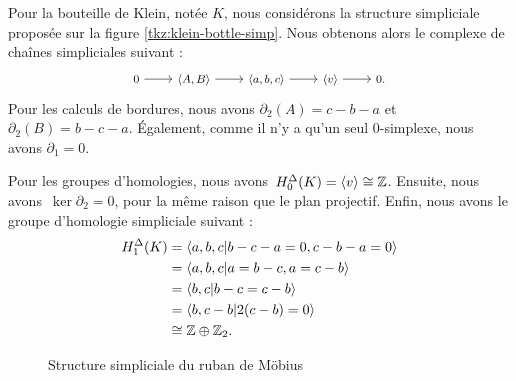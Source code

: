\phantom{}

\begin{exemple}
Pour la bouteille de Klein, notée $K$, nous considérons la structure simpliciale proposée sur la figure \ref{tkz:klein-bottle-simp}. Nous obtenons alors le complexe de chaînes simpliciales suivant : 
\[\footnotesize
\begin{tikzcd}
0\arrow[r]&\langle A,B\rangle\arrow[r]&\langle a,b,c\rangle\arrow[r]&\langle v\rangle\arrow[r]&0.
\end{tikzcd}
\]Pour les calculs de bordures, nous avons $\partial_2(A)=c-b-a$ et~${\partial_2(B)=b-c-a}$. Également, comme il n'y a qu'un seul 0-simplexe, nous avons $\partial_1=0$.

Pour les groupes d'homologies, nous avons~${H^\Delta_0(K)=\langle v\rangle\cong\mathbb{Z}}$. Ensuite, nous avons~${\ker\partial_2=0}$, pour la même raison que le plan projectif. Enfin, nous avons le groupe d'homologie simpliciale suivant : \[\begin{split}
H^\Delta_1(K)&=\langle a,b,c|b-c-a=0,c-b-a=0\rangle\\
&=\langle a,b,c|a=b-c,a=c-b\rangle\\
&=\langle b,c|b-c=c-b\rangle\\
&=\langle b,c-b|2(c-b)=0\rangle\\
&\cong \mathbb{Z}\oplus\mathbb{Z}_2.
\end{split}\]
\end{exemple}

\begin{wrapfigure}{r}{.3\textwidth}
\centering
{}
\caption{\centering Structure simpliciale du ruban de Möbius}
\label{tkz:mobius-strip-simp}
\end{wrapfigure}

